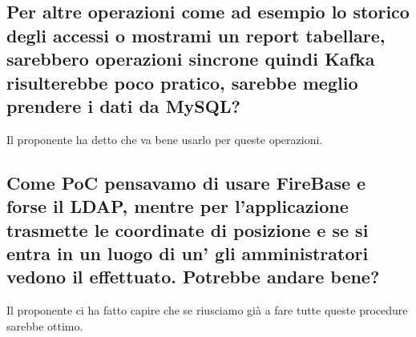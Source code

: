 \subsection{Per altre operazioni come ad esempio lo storico degli accessi o mostrami un report tabellare, sarebbero operazioni sincrone quindi Kafka risulterebbe poco pratico, 
sarebbe meglio prendere i dati da MySQL?}
Il proponente ha detto che va bene usarlo per queste operazioni.

\subsection{Come PoC pensavamo di usare FireBase e forse il LDAP, mentre per l'applicazione trasmette le coordinate di posizione e se si entra in un luogo di un' gli 
amministratori vedono il  effettuato. Potrebbe andare bene?}
Il proponente ci ha fatto capire che se riusciamo già a fare tutte queste procedure sarebbe ottimo.

\clearpage